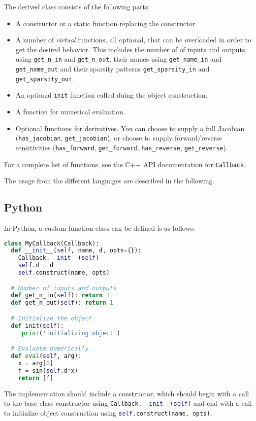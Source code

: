 \documentclass[a4paper,12pt]{book}
\newcommand{\python}[1]{\lstinline[language=Python]{#1}}
\begin{document}
The derived class consists of the following parts:
\begin{itemize}
  \item A constructor or a static function replacing the constructor
  \item A number of \emph{virtual} functions, all optional, that can be overloaded
  in order to get the desired behavior. This includes the number of
  of inputs and outputs using \verb|get_n_in| and \verb|get_n_out|,
  their names using \verb|get_name_in| and \verb|get_name_out|
  and their sparsity patterns \verb|get_sparsity_in| and \verb|get_sparsity_out|.
  \item An optional \verb|init| function called duing the object construction.
  \item A function for numerical evaluation.
  \item Optional functions for derivatives. You can choose to supply a full Jacobian (\verb|has_jacobian|, \verb|get_jacobian|), or choose to supply forward/reverse sensitivities (\verb|has_forward|, \verb|get_forward|,  \verb|has_reverse|, \verb|get_reverse|).
\end{itemize}

For a complete list of functions, see the C++ API documentation for
\texttt{Callback}.

The usage from the different languages are described in the following.

\subsection*{Python}
In Python, a custom function class can be defined is as follows:
\begin{lstlisting}[language=Python]
class MyCallback(Callback):
  def __init__(self, name, d, opts={}):
    Callback.__init__(self)
    self.d = d
    self.construct(name, opts)

  # Number of inputs and outputs
  def get_n_in(self): return 1
  def get_n_out(self): return 1

  # Initialize the object
  def init(self):
     print('initializing object')

  # Evaluate numerically
  def eval(self, arg):
    x = arg[0]
    f = sin(self.d*x)
    return [f]
\end{lstlisting}

The implementation should include a constructor, which should begin with a call to
the base class constructor using
\python{Callback.__init__(self)} and end with a call to
initialize object construction using \python{self.construct(name, opts)}.
\end{document}
